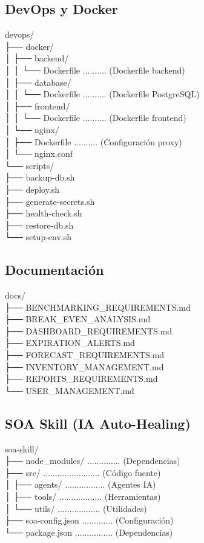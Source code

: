 \documentclass[12pt,a4paper]{article}
\begin{document}
\subsection{DevOps y Docker}
devops/ \\
├── docker/ \\
│   ├── backend/ \\
│   │   └── Dockerfile .......... (Dockerfile backend) \\
│   ├── database/ \\
│   │   └── Dockerfile .......... (Dockerfile PostgreSQL) \\
│   ├── frontend/ \\
│   │   └── Dockerfile .......... (Dockerfile frontend) \\
│   └── nginx/ \\
│       ├── Dockerfile .......... (Configuraci\'on proxy) \\
│       └── nginx.conf \\
└── scripts/ \\
    ├── backup-db.sh \\
    ├── deploy.sh \\
    ├── generate-secrets.sh \\
    ├── health-check.sh \\
    ├── restore-db.sh \\
    └── setup-env.sh

\subsection{Documentaci\'on}
docs/ \\
├── BENCHMARKING\_REQUIREMENTS.md \\
├── BREAK\_EVEN\_ANALYSIS.md \\
├── DASHBOARD\_REQUIREMENTS.md \\
├── EXPIRATION\_ALERTS.md \\
├── FORECAST\_REQUIREMENTS.md \\
├── INVENTORY\_MANAGEMENT.md \\
├── REPORTS\_REQUIREMENTS.md \\
└── USER\_MANAGEMENT.md

\subsection{SOA Skill (IA Auto-Healing)}
soa-skill/ \\
├── node\_modules/ .............. (Dependencias) \\
├── src/ ........................ (C\'odigo fuente) \\
│   ├── agents/ ................. (Agentes IA) \\
│   ├── tools/ .................. (Herramientas) \\
│   └── utils/ .................. (Utilidades) \\
├── soa-config.json ............. (Configuraci\'on) \\
└── package.json ................ (Dependencias)
\end{document}
